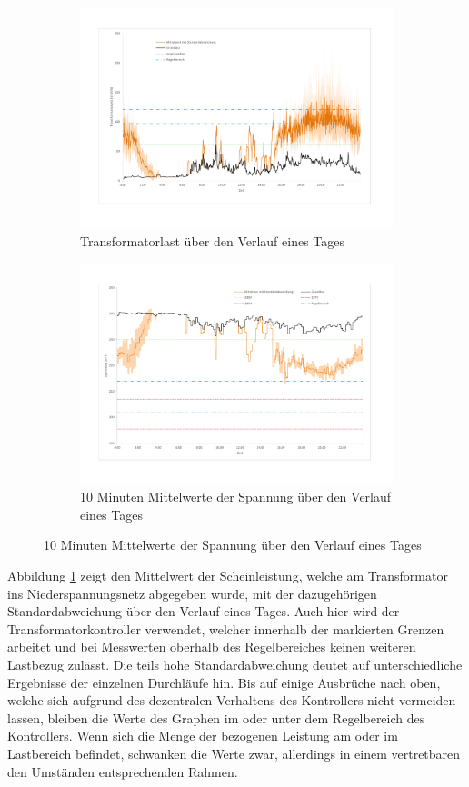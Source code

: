 \begin{figure}
	\begin{subfigure}{\linewidth}
		\includegraphics[scale=0.5]{img/SA_wT_trafo/TrafoLast.pdf}
		\caption{Transformatorlast über den Verlauf eines Tages}
		\label{Abb_SAwtTrafo_TrafoLast}
	\end{subfigure}
	\begin{subfigure}{\linewidth}
		\includegraphics[scale=0.5]{img/SA_wT_trafo/Spannung.pdf}
		\caption{10 Minuten Mittelwerte der Spannung über den Verlauf eines Tages}
		\label{Abb_SAwtTrafo_Spannung}
	\end{subfigure}
\end{figure}
Abbildung \ref{Abb_SAwtTrafo_TrafoLast} zeigt den Mittelwert der Scheinleistung, welche am Transformator ins Niederspannungsnetz abgegeben wurde, mit der dazugehörigen Standardabweichung über den Verlauf eines Tages. Auch hier wird der Transformatorkontroller verwendet, welcher innerhalb der markierten Grenzen arbeitet und bei Messwerten oberhalb des Regelbereiches keinen weiteren Lastbezug zulässt. Die teils hohe Standardabweichung deutet auf unterschiedliche Ergebnisse der einzelnen Durchläufe hin. Bis auf einige Ausbrüche nach oben, welche sich aufgrund des dezentralen Verhaltens des Kontrollers nicht vermeiden lassen, bleiben die Werte des Graphen im oder unter dem Regelbereich des Kontrollers. Wenn sich die Menge der bezogenen Leistung am oder im Lastbereich befindet, schwanken die Werte zwar, allerdings in einem vertretbaren den Umständen entsprechenden Rahmen.\\
